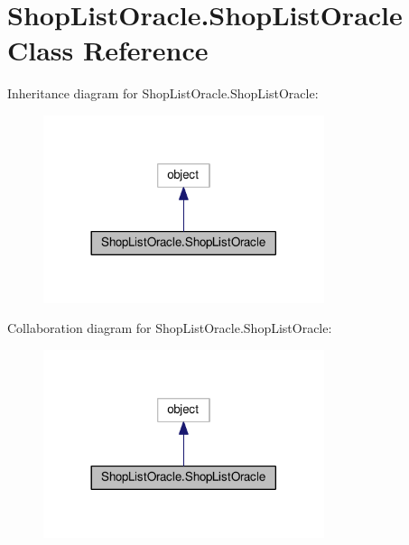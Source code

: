 \hypertarget{class_shop_list_oracle_1_1_shop_list_oracle}{}\section{Shop\+List\+Oracle.\+Shop\+List\+Oracle Class Reference}
\label{class_shop_list_oracle_1_1_shop_list_oracle}


Inheritance diagram for Shop\+List\+Oracle.\+Shop\+List\+Oracle\+:\nopagebreak
\begin{figure}[H]
\begin{center}
\leavevmode
\includegraphics[width=233pt]{class_shop_list_oracle_1_1_shop_list_oracle__inherit__graph}
\end{center}
\end{figure}


Collaboration diagram for Shop\+List\+Oracle.\+Shop\+List\+Oracle\+:\nopagebreak
\begin{figure}[H]
\begin{center}
\leavevmode
\includegraphics[width=233pt]{class_shop_list_oracle_1_1_shop_list_oracle__coll__graph}
\end{center}
\end{figure}
